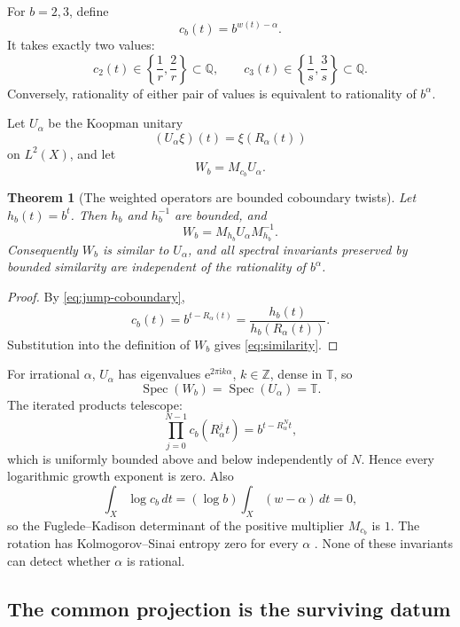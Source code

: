 \documentclass[11pt,oneside]{article}
\newtheorem{theorem}{Theorem}[section]
\theoremstyle{definition}
\theoremstyle{remark}
\newcommand{\Z}{\mathbb Z}
\newcommand{\Q}{\mathbb Q}
\newcommand{\Spec}{\operatorname{Spec}}
\newcommand{\ee}{\mathrm e}
\newcommand{\ii}{\mathrm i}
\begin{document}
For \(b=2,3\), define
\begin{equation}\label{eq:cocycle}
        c_b(t)=b^{w(t)-\alpha}.
\end{equation}
It takes exactly two values:
\[
        c_2(t)\in\left\{\frac1r,\frac2r\right\}\subset\Q,
        \qquad
        c_3(t)\in\left\{\frac1s,\frac3s\right\}\subset\Q.
\]
Conversely, rationality of either pair of values is equivalent to
rationality of \(b^\alpha\).

Let \(U_\alpha\) be the Koopman unitary
\[
        (U_\alpha\xi)(t)=\xi(R_\alpha(t))
\]
on \(L^2(X)\), and let
\[
        W_b=M_{c_b}U_\alpha.
\]

\begin{theorem}[The weighted operators are bounded coboundary twists]
\label{thm:koopman-similar}
Let \(h_b(t)=b^t\).  Then \(h_b\) and \(h_b^{-1}\) are bounded, and
\begin{equation}\label{eq:similarity}
        W_b=M_{h_b}U_\alpha M_{h_b}^{-1}.
\end{equation}
Consequently \(W_b\) is similar to \(U_\alpha\), and all spectral
invariants preserved by bounded similarity are independent of the
rationality of \(b^\alpha\).
\end{theorem}

\begin{proof}
By \eqref{eq:jump-coboundary},
\[
        c_b(t)=b^{t-R_\alpha(t)}
              =\frac{h_b(t)}{h_b(R_\alpha(t))}.
\]
Substitution into the definition of \(W_b\) gives
\eqref{eq:similarity}.
\end{proof}

For irrational \(\alpha\), \(U_\alpha\) has eigenvalues
\(\ee^{2\pi\ii k\alpha}\), \(k\in\Z\), dense in \(\mathbb T\), so
\[
        \Spec(W_b)=\Spec(U_\alpha)=\mathbb T.
\]
The iterated products telescope:
\begin{equation}\label{eq:cocycle-telescope}
 \prod_{j=0}^{N-1}c_b(R_\alpha^jt)
 =b^{t-R_\alpha^Nt},
\end{equation}
which is uniformly bounded above and below independently of \(N\).
Hence every logarithmic growth exponent is zero.  Also
\[
        \int_X\log c_b\,dt
        =(\log b)\int_X(w-\alpha)\,dt=0,
\]
so the Fuglede--Kadison determinant of the positive multiplier
\(M_{c_b}\) is \(1\).  The rotation has Kolmogorov--Sinai entropy zero
for every \(\alpha\) \cite{Walters}.  None of these invariants can detect whether
\(\alpha\) is rational.

\subsection{The common projection is the surviving datum}
\end{document}
